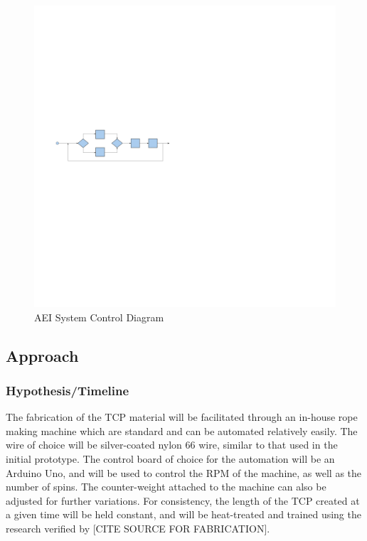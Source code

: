 \begin{figure}[ht]
	\centering
	\includegraphics[scale=0.30]{control_diagram}
	\caption{AEI System Control Diagram}
	\label{fig:control_diagram}
\end{figure}

\subsection{Approach}

	\subsubsection{Hypothesis/Timeline}

	

The fabrication of the TCP material will be facilitated through an in-house rope making machine which are standard and can be automated relatively easily. The wire of choice will be silver-coated nylon 66 wire, similar to that used in the initial prototype. The control board of choice for the automation will be an Arduino Uno, and will be used to control the RPM of the machine, as well as the number of spins. The counter-weight attached to the machine can also be adjusted for further variations. For consistency, the length of the TCP created at a given time will be held constant, and will be heat-treated and trained using the research verified by [CITE SOURCE FOR FABRICATION].

